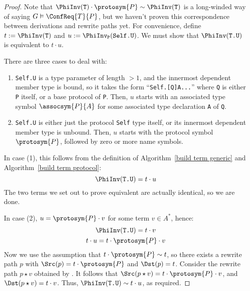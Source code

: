 \documentclass[../generics]{subfiles}
\begin{document}
\begin{proof}
Note that $\PhiInv(\texttt{T})\cdot\protosym{P}\sim\PhiInv(\texttt{T})$ is a long-winded way of saying $G\vDash\ConfReq{T}{P}$, but we haven't proven this correspondence between derivations and rewrite paths yet. For convenience, define $t:=\PhiInv(\texttt{T})$ and $u:=\PhiInv_\texttt{P}(\texttt{Self.U})$. We must show that $\PhiInv(\texttt{T.U})$ is equivalent to $t\cdot u$.

There are three cases to deal with:
\begin{enumerate}
\item \texttt{Self.U} is a type parameter of length $>1$, and the innermost dependent member type is bound, so it takes the form ``\texttt{Self.[Q]A...}'' where \texttt{Q} is either \texttt{P} itself, or a base protocol of \texttt{P}. Then, $u$ starts with an associated type symbol $\assocsym{P}{A}$ for some associated type declaration \texttt{A} of \texttt{Q}.
\item \texttt{Self.U} is either just the protocol \texttt{Self} type itself, or its innermost dependent member type is unbound. Then, $u$ starts with the protocol symbol $\protosym{P}$, followed by zero or more name symbols.
\end{enumerate}

In case (1), this follows from the definition of Algorithm~\ref{build term generic} and Algorithm~\ref{build term protocol}:
\[\PhiInv(\texttt{T.U})=t\cdot u\]
The two terms we set out to prove equivalent are actually identical, so we are done.

In case (2), $u=\protosym{P}\cdot v$ for some term $v\in A^*$, hence:
\begin{gather*}
\PhiInv(\texttt{T.U})=t\cdot v\\
t\cdot u=t\cdot \protosym{P}\cdot v
\end{gather*}
Now we use the assumption that $t\cdot\protosym{P}\sim t$, so there exists a rewrite path $p$ with $\Src(p)=t\cdot\protosym{P}$ and $\Dst(p)=t$. Consider the rewrite path $p\star v$ obtained by . It follows that $\Src(p\star v)=t\cdot\protosym{P}\cdot v$, and $\Dst(p\star v)=t\cdot v$. Thus,
$\PhiInv(\texttt{T.U})\sim t\cdot u$, as required.
\end{proof}
\end{document}
